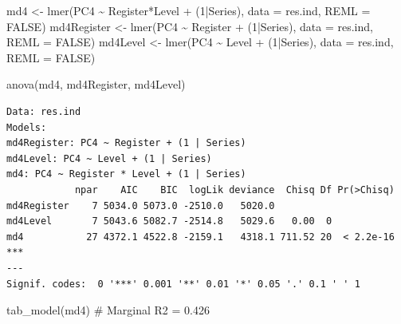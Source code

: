 \documentclass[
  letterpaper,
  DIV=11,
  numbers=noendperiod]{scrreprt}
\newenvironment{Shaded}{\begin{snugshade}}{\end{snugshade}}
\newcommand{\AttributeTok}[1]{\textcolor[rgb]{0.40,0.45,0.13}{#1}}
\newcommand{\CommentTok}[1]{\textcolor[rgb]{0.37,0.37,0.37}{#1}}
\newcommand{\ConstantTok}[1]{\textcolor[rgb]{0.56,0.35,0.01}{#1}}
\newcommand{\DecValTok}[1]{\textcolor[rgb]{0.68,0.00,0.00}{#1}}
\newcommand{\FunctionTok}[1]{\textcolor[rgb]{0.28,0.35,0.67}{#1}}
\newcommand{\NormalTok}[1]{\textcolor[rgb]{0.00,0.23,0.31}{#1}}
\newcommand{\OtherTok}[1]{\textcolor[rgb]{0.00,0.23,0.31}{#1}}
\newcommand{\SpecialCharTok}[1]{\textcolor[rgb]{0.37,0.37,0.37}{#1}}
\begin{document}
\begin{Shaded}
\begin{Highlighting}[]
\NormalTok{md4 }\OtherTok{\textless{}{-}} \FunctionTok{lmer}\NormalTok{(PC4 }\SpecialCharTok{\textasciitilde{}}\NormalTok{ Register}\SpecialCharTok{*}\NormalTok{Level }\SpecialCharTok{+}\NormalTok{ (}\DecValTok{1}\SpecialCharTok{|}\NormalTok{Series), }\AttributeTok{data =}\NormalTok{ res.ind, }\AttributeTok{REML =} \ConstantTok{FALSE}\NormalTok{)}
\NormalTok{md4Register }\OtherTok{\textless{}{-}} \FunctionTok{lmer}\NormalTok{(PC4 }\SpecialCharTok{\textasciitilde{}}\NormalTok{ Register }\SpecialCharTok{+}\NormalTok{ (}\DecValTok{1}\SpecialCharTok{|}\NormalTok{Series), }\AttributeTok{data =}\NormalTok{ res.ind, }\AttributeTok{REML =} \ConstantTok{FALSE}\NormalTok{)}
\NormalTok{md4Level }\OtherTok{\textless{}{-}} \FunctionTok{lmer}\NormalTok{(PC4 }\SpecialCharTok{\textasciitilde{}}\NormalTok{ Level }\SpecialCharTok{+}\NormalTok{ (}\DecValTok{1}\SpecialCharTok{|}\NormalTok{Series), }\AttributeTok{data =}\NormalTok{ res.ind, }\AttributeTok{REML =} \ConstantTok{FALSE}\NormalTok{)}

\FunctionTok{anova}\NormalTok{(md4, md4Register, md4Level)}
\end{Highlighting}
\end{Shaded}

\begin{verbatim}
Data: res.ind
Models:
md4Register: PC4 ~ Register + (1 | Series)
md4Level: PC4 ~ Level + (1 | Series)
md4: PC4 ~ Register * Level + (1 | Series)
            npar    AIC    BIC  logLik deviance  Chisq Df Pr(>Chisq)    
md4Register    7 5034.0 5073.0 -2510.0   5020.0                         
md4Level       7 5043.6 5082.7 -2514.8   5029.6   0.00  0               
md4           27 4372.1 4522.8 -2159.1   4318.1 711.52 20  < 2.2e-16 ***
---
Signif. codes:  0 '***' 0.001 '**' 0.01 '*' 0.05 '.' 0.1 ' ' 1
\end{verbatim}

\begin{Shaded}
\begin{Highlighting}[]
\FunctionTok{tab\_model}\NormalTok{(md4) }\CommentTok{\# Marginal R2 = 0.426}
\end{Highlighting}
\end{Shaded}
\end{document}
